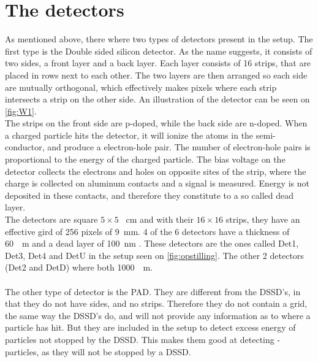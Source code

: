 \section{The detectors}
As mentioned above, there where two types of detectors present in the setup. The first type is the Double sided silicon detector. 
As the name suggests, it consists of two sides, a front layer and a back layer. Each layer consists of 16 strips, that are placed in rows next to each other. The two layers are then arranged so each side are mutually orthogonal, which effectively makes pixels where each strip intersects a strip on the other side. An illustration of the detector can be seen on \cref{fig:W1}.\\
The strips on the front side are p-doped, while the back side are n-doped. When a charged particle hits the detector, it will ionize the atoms in the semi-conductor, and produce a electron-hole pair. The number of electron-hole pairs is proportional to the energy of the charged particle. 
The bias voltage on the detector collects the electrons and holes on opposite sites of the strip, where the charge is collected on aluminum contacts and a signal is measured. Energy is not deposited in these contacts, and therefore they constitute to a so called dead layer. \\
The detectors are square $5\times 5$ \SI{}{cm} and with their $16\times 16$ strips, they have an effective gird of  256 pixels of \SI{9}{mm}. 
4 of the 6 detectors have a thickness of \SI{60}{\mu m} and a dead layer of \SI{100}{nm} . These detectors are the ones called Det1, Det3, Det4 and DetU in the setup seen on \cref{fig:opstilling}. The other 2 detectors (Det2 and DetD) where both \SI{1000}{\mu m}.
\\
\\
The other type of detector is the PAD. They are different from the DSSD's, in that they do not have sides, and no strips. Therefore they do not contain a grid, the same way the DSSD's do, and will not provide any information as to where a particle has hit. But they are included in the setup to detect excess energy of particles not stopped by the DSSD. This makes them good at detecting \be-particles, as they will not be stopped by a DSSD.


